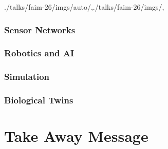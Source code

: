 \begin{bibliographysection}
\begin{graphicspathcontext}{{./talks/faim-26/imgs/auto/},{./talks/faim-26/imgs/},\old}
\section{Sensor Networks}
\localized

\section{Robotics and AI}
\localized
\localized

\section{Simulation}
\localized

\section{Biological Twins}
\localized

\part{Take Away Message}

\localized

\appendix

\localized

\localized
\localized
\localized
\localized

\end{graphicspathcontext}
\end{bibliographysection}

\endinput
